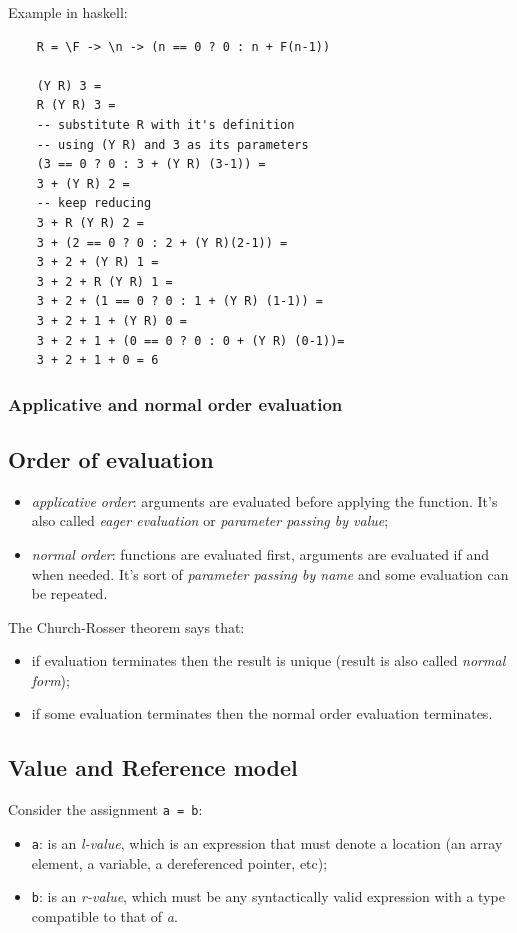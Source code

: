 Example in haskell:
\begin{verbatim}
    R = \F -> \n -> (n == 0 ? 0 : n + F(n-1))

    (Y R) 3 =
    R (Y R) 3 =
    -- substitute R with it's definition
    -- using (Y R) and 3 as its parameters
    (3 == 0 ? 0 : 3 + (Y R) (3-1)) =
    3 + (Y R) 2 =
    -- keep reducing
    3 + R (Y R) 2 =
    3 + (2 == 0 ? 0 : 2 + (Y R)(2-1)) =
    3 + 2 + (Y R) 1 =
    3 + 2 + R (Y R) 1 =
    3 + 2 + (1 == 0 ? 0 : 1 + (Y R) (1-1)) =
    3 + 2 + 1 + (Y R) 0 =
    3 + 2 + 1 + (0 == 0 ? 0 : 0 + (Y R) (0-1))=
    3 + 2 + 1 + 0 = 6    
\end{verbatim}

\subsubsection{Applicative and normal order evaluation}

\subsection{Order of evaluation}
\begin{itemize}
    \item \emph{applicative order}: arguments are evaluated before applying the function.
    It's also called \emph{eager evaluation} or \emph{parameter passing by value};

    \item \emph{normal order}: functions are evaluated first, arguments are evaluated if and when needed.
    It's sort of \emph{parameter passing by name} and some evaluation can be repeated.
\end{itemize}

The Church-Rosser theorem says that:
\begin{itemize}
    \item if evaluation terminates then the result is unique (result is also called \emph{normal form});
    \item if some evaluation terminates then the normal order evaluation terminates.
\end{itemize}

\subsection{Value and Reference model}
Consider the assignment \verb|a = b|:
\begin{itemize}
    \item \verb|a|: is an \emph{l-value}, which is an expression that must denote a location (an array element, a variable, a dereferenced pointer, etc);

    \item \verb|b|: is an \emph{r-value}, which must be any syntactically valid expression with a type compatible to that of \emph{a}.
\end{itemize}

